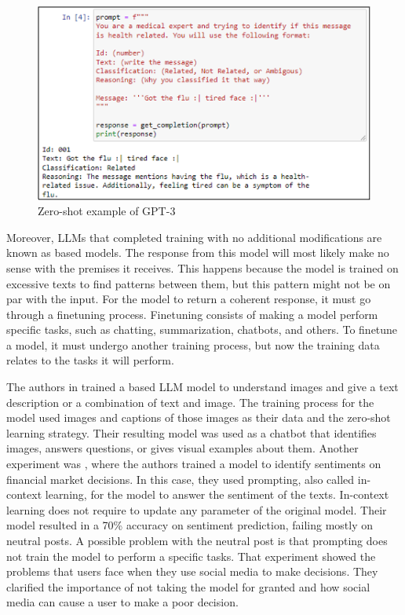  \begin{figure}[!h]
    \centering
        \includegraphics[width=0.9\linewidth]{images/gpt_example.png}
        \caption{Zero-shot example of GPT-3}
        \label{gpt_example}
\end{figure}


Moreover, LLMs that completed training with no additional modifications are known as based models. The response from this model will most likely make no sense with the premises it receives.
This happens because the model is trained on excessive texts to find patterns between them, but this pattern might not be on par with the input. For the model to return a coherent response, it must go
through a finetuning process. Finetuning consists of making a model perform specific tasks, such as chatting, summarization, chatbots, and others.
To finetune a model, it must undergo another training process, but now the training data relates to the tasks it will perform. 

The authors in \cite{koh2023groundinglanguagemodelsimages} trained a based LLM model to understand images and give a text description or a combination of text and image. The training process for
the model used images and captions of those images as their data and the zero-shot learning strategy. Their resulting model was used as a chatbot that identifies images, answers questions, or gives
visual examples about them. Another experiment was \cite{inproceedings}, where the authors trained a model to identify sentiments on financial market decisions. In this case, they used prompting, also called in-context learning, for 
the model to answer the sentiment of the texts. In-context learning does not require to update any parameter of the original model. Their model resulted in a 70\% accuracy on sentiment prediction, failing mostly on neutral posts.
A possible problem with the neutral post is that prompting does not train the model to perform a specific tasks. That experiment showed the problems that users face when they use social media to make decisions.
They clarified the importance of not taking the model for granted and how social media can cause a user to make a poor decision.

